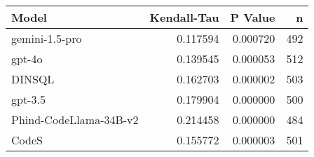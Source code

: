 \begin{tabular}{lrrr}
\toprule
Model & Kendall-Tau & P Value & n \\
\midrule
gemini-1.5-pro & 0.117594 & 0.000720 & 492 \\
gpt-4o & 0.139545 & 0.000053 & 512 \\
DINSQL & 0.162703 & 0.000002 & 503 \\
gpt-3.5 & 0.179904 & 0.000000 & 500 \\
Phind-CodeLlama-34B-v2 & 0.214458 & 0.000000 & 484 \\
CodeS & 0.155772 & 0.000003 & 501 \\
\bottomrule
\end{tabular}
